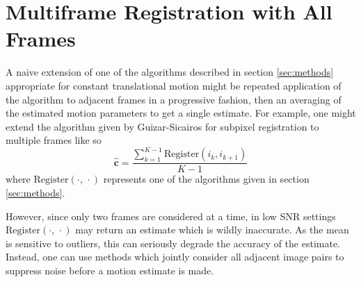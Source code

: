 \documentclass[tocnosub,noragright,centerchapter,12pt]{uiucecethesis09}
\begin{document}






\section{Multiframe Registration with All Frames} \label{sec:algorithm}

A naive extension of one of the algorithms described in section \ref{sec:methods} appropriate for constant translational motion might be repeated application of the algorithm to adjacent frames in a progressive fashion, then an averaging of the estimated motion parameters to get a single estimate.  For example, one might extend the algorithm given by Guizar-Sicairos for subpixel registration to multiple frames like so
$$\hat{\bm{c}} = \frac{\sum_{k=1}^{K-1} \text{Register}(i_k, i_{k+1})}{K-1}$$
where $\text{Register}(\cdot,\,\cdot)$ represents one of the algorithms given in section \ref{sec:methods}.

However, since only two frames are considered at a time, in low SNR settings $\text{Register}(\cdot,\,\cdot)$ may return an estimate which is wildly inaccurate.  As the mean is sensitive to outliers, this can seriously degrade the accuracy of the estimate.
Instead, one can use methods which jointly consider all adjacent image pairs to suppress noise before a motion estimate is made.
\end{document}
